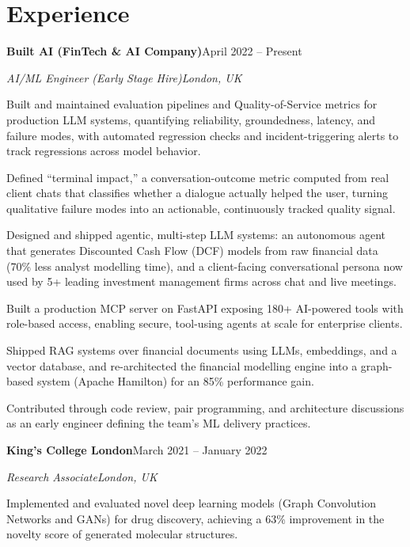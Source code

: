 \documentclass[10pt,a4paper]{article}
\newcommand{\entry}[4]{%
  {\color{company}\bfseries #1}\hfill {\color{muted}#2}\par
  \vspace{1pt}
  {\itshape #3}\hfill {\color{muted}\itshape #4}\par
  \vspace{3pt}%
}
\begin{document}
\section{Experience}
\entry{Built AI (FinTech \& AI Company)}{April 2022 -- Present}{AI/ML Engineer (Early Stage Hire)}{London, UK}
\begin{tight}
  \item Built and maintained evaluation pipelines and Quality-of-Service metrics for production LLM systems, quantifying reliability, groundedness, latency, and failure modes, with automated regression checks and incident-triggering alerts to track regressions across model behavior.
  \item Defined ``terminal impact,'' a conversation-outcome metric computed from real client chats that classifies whether a dialogue actually helped the user, turning qualitative failure modes into an actionable, continuously tracked quality signal.
  \item Designed and shipped agentic, multi-step LLM systems: an autonomous agent that generates Discounted Cash Flow (DCF) models from raw financial data (70\% less analyst modelling time), and a client-facing conversational persona now used by 5+ leading investment management firms across chat and live meetings.
  \item Built a production MCP server on FastAPI exposing 180+ AI-powered tools with role-based access, enabling secure, tool-using agents at scale for enterprise clients.
  \item Shipped RAG systems over financial documents using LLMs, embeddings, and a vector database, and re-architected the financial modelling engine into a graph-based system (Apache Hamilton) for an 85\% performance gain.
  \item Contributed through code review, pair programming, and architecture discussions as an early engineer defining the team's ML delivery practices.
\end{tight}

\entry{King's College London}{March 2021 -- January 2022}{Research Associate}{London, UK}
\begin{tight}
  \item Implemented and evaluated novel deep learning models (Graph Convolution Networks and GANs) for drug discovery, achieving a 63\% improvement in the novelty score of generated molecular structures.
\end{tight}
\end{document}
